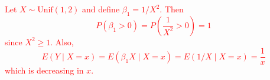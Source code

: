 \documentclass[12pt]{article}
\newcommand{\1}{\mathds 1}
\begin{document}
\begin{enumerate}
\textcolor{red}{
Let $X \sim \text{Unif}(1, 2)$ and define $\beta_1 = 1/X^2$. Then 
\begin{equation*}
    P(\beta_1 > 0) = P\left(\frac{1}{X^2} > 0\right) = 1
\end{equation*}
since $X^2 \geq 1$. Also, 
\begin{equation*}
    E(Y \mid X = x) = E(\beta_1 X \mid X = x) = E(1/X \mid X = x) = \frac{1}{x} 
\end{equation*}
which is decreasing in $x$. 
}

\end{enumerate}
\end{document}
